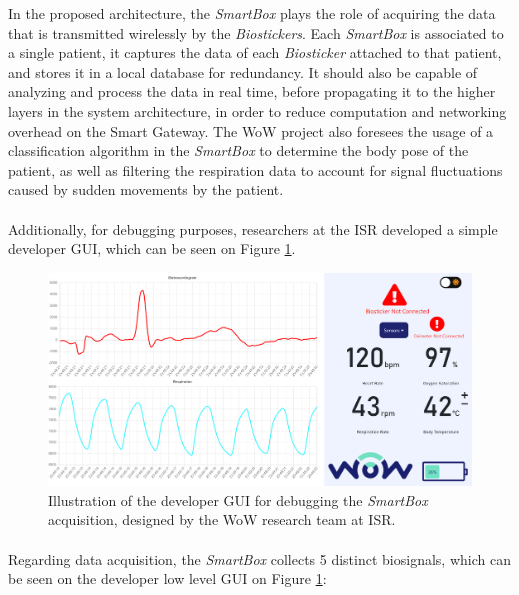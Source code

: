 
In the proposed architecture, the \textit{SmartBox} plays the role of acquiring the data that is transmitted wirelessly by the \textit{Biostickers}.
Each \textit{SmartBox} is associated to a single patient, it captures the data of each \textit{Biosticker} attached to that patient, and stores it in a local database for redundancy. 
It should also be capable of analyzing and process the data in real time, before propagating it to the higher layers in the system architecture, in order to reduce computation and networking overhead on the Smart Gateway. The \acs{WoW} project also foresees the usage of a classification algorithm in the \textit{SmartBox} to determine the body pose of the patient, as well as filtering the respiration data to account for signal fluctuations caused by sudden movements by the patient.  


\paragraph{} Additionally, for debugging purposes, researchers at the \acs{ISR} developed a simple developer \acs{GUI}, which can be seen on Figure \ref{fig:smartbox-gui}.

\begin{figure}[H]
    \centering
    \includegraphics[width=\linewidth]{images/smartbox-gui.png}
    \caption{Illustration of the developer \acf{GUI} for debugging the \textit{SmartBox} acquisition, designed by the \acs{WoW} research team at \acs{ISR}.}
    \label{fig:smartbox-gui}
\end{figure}

\paragraph{} Regarding data acquisition, the \textit{SmartBox} collects 5 distinct biosignals, which can be seen on the developer low level \acs{GUI} on Figure \ref{fig:smartbox-gui}:

